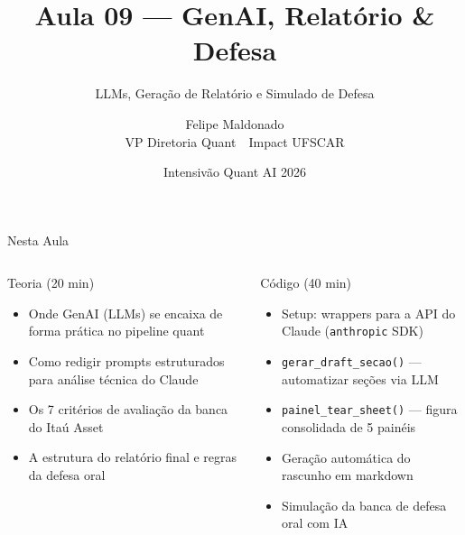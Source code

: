 \documentclass[aspectratio=169,12pt]{beamer}
\author{Felipe Maldonado\\{\scriptsize VP Diretoria Quant~\textbullet{}~Impact UFSCAR}}
\date{Intensivão Quant AI 2026}
\title{Aula 09 --- GenAI, Relatório \& Defesa}
\subtitle{LLMs, Geração de Relatório e Simulado de Defesa}
\begin{document}
\begin{frame}[plain]
\titlepage
\end{frame}

\begin{frame}[fragile]{Nesta Aula}
\begin{columns}[T]
\begin{block}{Teoria (20 min)}
\begin{itemize}
  \item Onde GenAI (LLMs) se encaixa de forma prática no pipeline quant
  \item Como redigir prompts estruturados para análise técnica do Claude
  \item Os 7 critérios de avaliação da banca do Itaú Asset
  \item A estrutura do relatório final e regras da defesa oral
\end{itemize}
\end{block}
\begin{block}{Código (40 min)}
\begin{itemize}
  \item Setup: wrappers para a API do Claude (\texttt{anthropic} SDK)
  \item \texttt{gerar\_draft\_secao()} — automatizar seções via LLM
  \item \texttt{painel\_tear\_sheet()} — figura consolidada de 5 painéis
  \item Geração automática do rascunho em markdown
  \item Simulação da banca de defesa oral com IA
\end{itemize}
\end{block}
\end{columns}
\end{frame}
\end{document}
